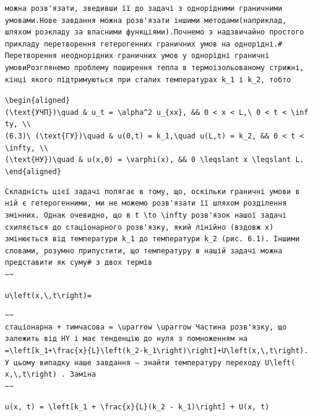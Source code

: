 \documentclass[
  ukrainian,
]{article}
\begin{document}
\begin{verbatim}
можна розв'язати, зведивши її до задачі з однорідними граничними умовами.Нове завдання можна розв'язати іншими методами(наприклад, шляхом розкладу за власними функціями).Почнемо з надзвичайно простого прикладу перетворення гетерогенних граничних умов на однорідні.# Перетворення неоднорідних граничних умов у однорідні граничні умовиРозглянемо проблему поширення тепла в термоізольованому стрижні, кінці якого підтримуються при сталих температурах k_1 і k_2, тобто
\end{verbatim}

\texttt{\textbackslash{}begin\{aligned\}}
\texttt{(\textbackslash{}text\{УЧП\})\textbackslash{}quad\ \&\ u\_t\ =\ \textbackslash{}alpha\^{}2\ u\_\{xx\},\ \&\&\ 0\ \textless{}\ x\ \textless{}\ L,\textbackslash{}\ 0\ \textless{}\ t\ \textless{}\ \textbackslash{}infty,\ \textbackslash{}\textbackslash{}}
\texttt{(6.3)\textbackslash{}\ (\textbackslash{}text\{ГУ\})\textbackslash{}quad\ \&\ u(0,t)\ =\ k\_1,\textbackslash{}quad\ u(L,t)\ =\ k\_2,\ \&\&\ 0\ \textless{}\ t\ \textless{}\ \textbackslash{}infty,\ \textbackslash{}\textbackslash{}}
\texttt{(\textbackslash{}text\{НУ\})\textbackslash{}quad\ \&\ u(x,0)\ =\ \textbackslash{}varphi(x),\ \&\&\ 0\ \textbackslash{}leqslant\ x\ \textbackslash{}leqslant\ L.}
\texttt{\textbackslash{}end\{aligned\}}

\begin{verbatim}
Складність цієї задачі полягає в тому, що, оскільки граничні умови в ній є гетерогенними, ми не можемо розв'язати її шляхом розділення змінних. Однак очевидно, що в t \to \infty розв'язок нашої задачі схиляється до стаціонарного розв'язку, який лінійно (вздовж x) змінюється від температури k_1 до температури k_2 (рис. 6.1). Іншими словами, розумно припустити, що температуру в нашій задачі можна представити як суму# з двох термів
~~
\end{verbatim}

\texttt{u\textbackslash{}left(x,\textbackslash{},t\textbackslash{}right)=}

\begin{verbatim}
~~
стаціонарна + тимчасова = \uparrow \uparrow Частина розв'язку, що залежить від HY і має тенденцію до нуля з помноженням на =\left[k_1+\frac{x}{L}\left(k_2-k_1\right)\right]+U\left(x,\,t\right). У цьому випадку наше завдання — знайти температуру переходу U\left( x,\,t\right) . Заміна
~~
\end{verbatim}

\texttt{u(x,\ t)\ =\ \textbackslash{}left{[}k\_1\ +\ \textbackslash{}frac\{x\}\{L\}(k\_2\ -\ k\_1)\textbackslash{}right{]}\ +\ U(x,\ t)}
\end{document}

